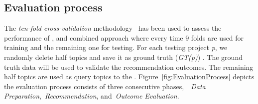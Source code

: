 



\subsection{Evaluation process}\label{sec:methodology-metric}
The \emph{ten-fold cross-validation} methodology~\cite{kohavi1995study} has been used to assess the performance of \CT, \MNB and combined approach where every time $9$ folds 
are used for training and the remaining one for testing.
For each testing project \emph{p}, we randomly delete half topics and save it as ground truth (\emph{GT(p)}) . The ground truth data  will be used to validate the recommendation outcomes. The remaining half topics are used as query topics to the \CT.
Figure~\ref{fig:EvaluationProcess} depicts the evaluation process consists of three consecutive phases,~\ie~\emph{Data Preparation},~\emph{Recommendation}, and~\emph{Outcome Evaluation}.

